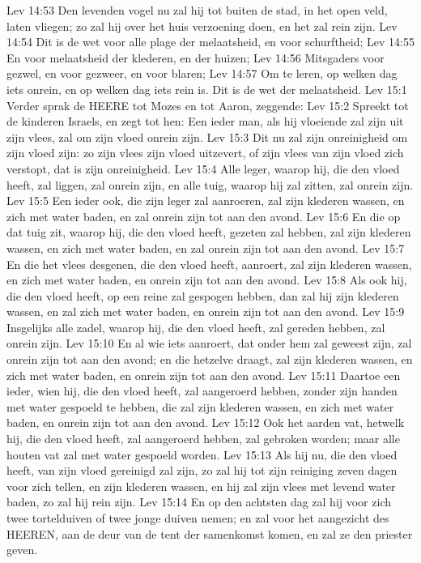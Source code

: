 Lev 14:53  Den levenden vogel nu zal hij tot buiten de stad, in het open veld, laten vliegen; zo zal hij over het huis verzoening doen, en het zal rein zijn.
Lev 14:54  Dit is de wet voor alle plage der melaatsheid, en voor schurftheid;
Lev 14:55  En voor melaatsheid der klederen, en der huizen;
Lev 14:56  Mitsgaders voor gezwel, en voor gezweer, en voor blaren;
Lev 14:57  Om te leren, op welken dag iets onrein, en op welken dag iets rein is. Dit is de wet der melaatsheid.
Lev 15:1  Verder sprak de HEERE tot Mozes en tot Aaron, zeggende:
Lev 15:2  Spreekt tot de kinderen Israels, en zegt tot hen: Een ieder man, als hij vloeiende zal zijn uit zijn vlees, zal om zijn vloed onrein zijn.
Lev 15:3  Dit nu zal zijn onreinigheid om zijn vloed zijn: zo zijn vlees zijn vloed uitzevert, of zijn vlees van zijn vloed zich verstopt, dat is zijn onreinigheid.
Lev 15:4  Alle leger, waarop hij, die den vloed heeft, zal liggen, zal onrein zijn, en alle tuig, waarop hij zal zitten, zal onrein zijn.
Lev 15:5  Een ieder ook, die zijn leger zal aanroeren, zal zijn klederen wassen, en zich met water baden, en zal onrein zijn tot aan den avond.
Lev 15:6  En die op dat tuig zit, waarop hij, die den vloed heeft, gezeten zal hebben, zal zijn klederen wassen, en zich met water baden, en zal onrein zijn tot aan den avond.
Lev 15:7  En die het vlees desgenen, die den vloed heeft, aanroert, zal zijn klederen wassen, en zich met water baden, en onrein zijn tot aan den avond.
Lev 15:8  Als ook hij, die den vloed heeft, op een reine zal gespogen hebben, dan zal hij zijn klederen wassen, en zal zich met water baden, en onrein zijn tot aan den avond.
Lev 15:9  Insgelijks alle zadel, waarop hij, die den vloed heeft, zal gereden hebben, zal onrein zijn.
Lev 15:10  En al wie iets aanroert, dat onder hem zal geweest zijn, zal onrein zijn tot aan den avond; en die hetzelve draagt, zal zijn klederen wassen, en zich met water baden, en onrein zijn tot aan den avond.
Lev 15:11  Daartoe een ieder, wien hij, die den vloed heeft, zal aangeroerd hebben, zonder zijn handen met water gespoeld te hebben, die zal zijn klederen wassen, en zich met water baden, en onrein zijn tot aan den avond.
Lev 15:12  Ook het aarden vat, hetwelk hij, die den vloed heeft, zal aangeroerd hebben, zal gebroken worden; maar alle houten vat zal met water gespoeld worden.
Lev 15:13  Als hij nu, die den vloed heeft, van zijn vloed gereinigd zal zijn, zo zal hij tot zijn reiniging zeven dagen voor zich tellen, en zijn klederen wassen, en hij zal zijn vlees met levend water baden, zo zal hij rein zijn.
Lev 15:14  En op den achtsten dag zal hij voor zich twee tortelduiven of twee jonge duiven nemen; en zal voor het aangezicht des HEEREN, aan de deur van de tent der samenkomst komen, en zal ze den priester geven.
